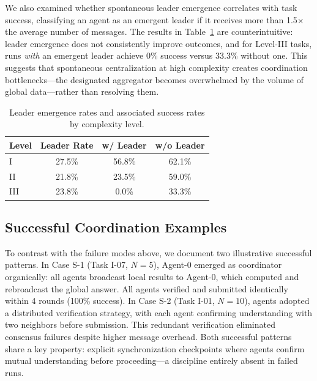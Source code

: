 We also examined whether spontaneous leader emergence correlates with task success, classifying an agent as an emergent leader if it receives more than 1.5$\times$ the average number of messages. The results in Table~\ref{tab:leader_emergence_full} are counterintuitive: leader emergence does not consistently improve outcomes, and for Level-III tasks, runs \textit{with} an emergent leader achieve 0\% success versus 33.3\% without one. This suggests that spontaneous centralization at high complexity creates coordination bottlenecks---the designated aggregator becomes overwhelmed by the volume of global data---rather than resolving them.

\begin{table}[t]
\centering
\small
\renewcommand{\arraystretch}{1.1}
\begin{tabular}{lccc}
\toprule
\textbf{Level} & \textbf{Leader Rate} & \textbf{w/ Leader} & \textbf{w/o Leader} \\
\midrule
I & 27.5\% & 56.8\% & 62.1\% \\
II & 21.8\% & 23.5\% & 59.0\% \\
III & 23.8\% & 0.0\% & 33.3\% \\
\bottomrule
\end{tabular}
\caption{Leader emergence rates and associated success rates by complexity level.}
\label{tab:leader_emergence_full}
\end{table}

\subsection{Successful Coordination Examples}
\label{app:success_cases}

To contrast with the failure modes above, we document two illustrative successful patterns. In Case S-1 (Task I-07, $N{=}5$), Agent-0 emerged as coordinator organically: all agents broadcast local results to Agent-0, which computed and rebroadcast the global answer. All agents verified and submitted identically within 4 rounds (100\% success). In Case S-2 (Task I-01, $N{=}10$), agents adopted a distributed verification strategy, with each agent confirming understanding with two neighbors before submission. This redundant verification eliminated consensus failures despite higher message overhead. Both successful patterns share a key property: explicit synchronization checkpoints where agents confirm mutual understanding before proceeding---a discipline entirely absent in failed runs.


